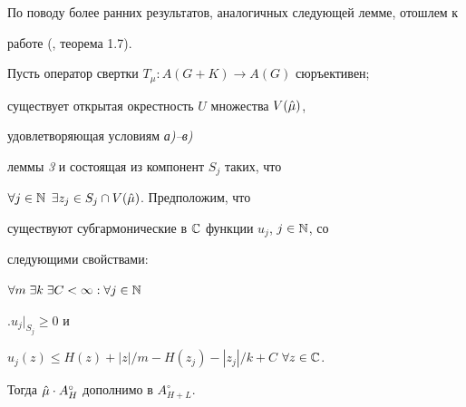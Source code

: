  


По поводу более ранних результатов, аналогичных следующей лемме, отошлем к 


работе (\cite{Lang2}, теорема 1.7). 


 


\begin{lem} Пусть оператор свертки $T_\mu :A(G+K)\to A(G)$ сюръективен; 


существует открытая окрестность $U$ множества $V(\Hat\mu)$, 


удовлетворяющая условиям {\em а)--в)}


леммы {\em 3} и состоящая из компонент $S_j$ таких, что 


$\forall j\in\Bbb N$ $\exists z_j\in S_j\cap V(\Hat\mu)$. Предположим, что 


существуют субгармонические в $\Bbb C$ функции $u_j$, $j\in\Bbb N$, со 


следующими свойствами: 


$\forall m\;\exists k\;\exists C<\infty :\forall j\in\Bbb N$ 


$\bigl.u_j\bigr|_{S_j}\ge 0$ и 


$u_j(z)\le H(z)+|z|/m-H(z_j)-|z_j|/k+C$ $\forall z\in\Bbb C$. 


Тогда $\Hat\mu\cdot A^\circ_H$ дополнимо в $A^\circ_{H+L}$. 


\end{lem} 


 


